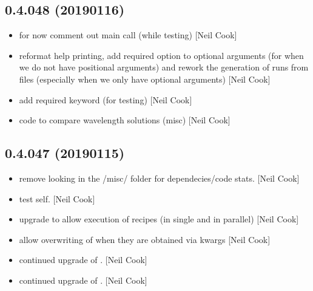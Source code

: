 \documentclass[a4paper,10pt,english]{report}
\begin{document}
\subsection{0.4.048 (2019\sphinxhyphen{}01\sphinxhyphen{}16)}
\label{\detokenize{misc/changelog:id235}}\begin{itemize}
\item {} 
 \sphinxhyphen{} for now comment out main call (while testing)
{[}Neil Cook{]}

\item {} 
 \sphinxhyphen{} reformat help printing, add required option to
optional arguments (for when we do not have positional arguments) and
rework the generation of runs from files (especially when we only have
optional arguments) {[}Neil Cook{]}

\item {} 
 \sphinxhyphen{} add required keyword (for testing) {[}Neil Cook{]}

\item {} 
 \sphinxhyphen{} code to compare wavelength solutions (misc) {[}Neil Cook{]}

\end{itemize}


\subsection{0.4.047 (2019\sphinxhyphen{}01\sphinxhyphen{}15)}
\label{\detokenize{misc/changelog:id236}}\begin{itemize}
\item {} 
 \sphinxhyphen{} remove looking in the /misc/ folder for
dependecies/code stats. {[}Neil Cook{]}

\item {} 
 \sphinxhyphen{} test self. {[}Neil Cook{]}

\item {} 
 \sphinxhyphen{} upgrade to allow execution of recipes (in single
and in parallel) {[}Neil Cook{]}

\item {} 
 \sphinxhyphen{} allow overwriting of  when they are
obtained via kwargs  {[}Neil Cook{]}

\item {} 
 \sphinxhyphen{} continued upgrade of . {[}Neil Cook{]}

\item {} 
 \sphinxhyphen{} continued upgrade of . {[}Neil Cook{]}

\end{itemize}
\end{document}
